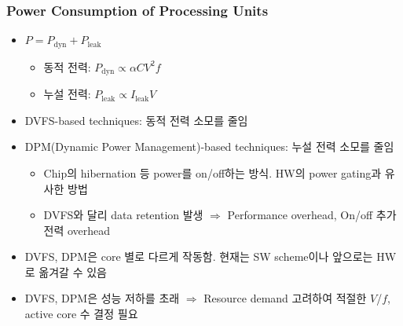 \subsubsection*{Power Consumption of Processing Units}
\begin{itemize}
    \item $P = P_{\mathrm{dyn}} + P_{\mathrm{leak}}$
    \begin{itemize}
        \item 동적 전력: $P_{\mathrm{dyn}} \varpropto \alpha CV^2f$
        \item 누설 전력: $P_{\mathrm{leak}} \varpropto I_{\mathrm{leak}}V$
    \end{itemize}
    \item DVFS-based techniques: 동적 전력 소모를 줄임
    \item DPM(Dynamic Power Management)-based techniques: 누설 전력 소모를 줄임
    \begin{itemize}
        \item Chip의 hibernation 등 power를 on/off하는 방식. HW의 power gating과 유사한 방법
        \item DVFS와 달리 data retention 발생 $\Rightarrow$ Performance overhead, On/off 추가 전력 overhead
    \end{itemize}
    \item DVFS, DPM은 core 별로 다르게 작동함. 현재는 SW scheme이나 앞으로는 HW로 옮겨갈 수 있음
    \item DVFS, DPM은 성능 저하를 초래 $\Rightarrow$ Resource demand 고려하여 적절한 $V$/$f$, active core 수 결정 필요
\end{itemize}

